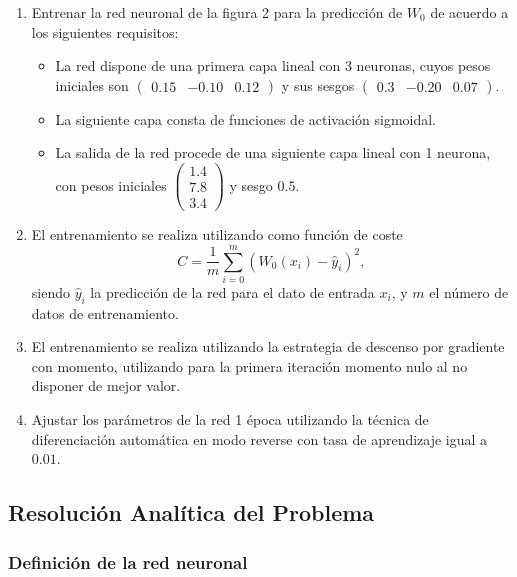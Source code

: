 \documentclass[paper=a4, fontsize=11pt]{scrartcl} %
\numberwithin{equation}{section} %
\numberwithin{figure}{section} %
\numberwithin{table}{section} %
\begin{document}
\begin{enumerate}
    \item Entrenar la red neuronal de la figura 2 para la predicción de \( W_0 \) de acuerdo a los siguientes requisitos:
    \begin{itemize}
        \item La red dispone de una primera capa lineal con 3 neuronas, cuyos pesos iniciales son 
        \(\begin{pmatrix} 0.15 & -0.10 & 0.12 \end{pmatrix}\) y sus sesgos \(\begin{pmatrix} 0.3 & -0.20 & 0.07 \end{pmatrix}\).
        
        \item La siguiente capa consta de funciones de activación sigmoidal.
        
        \item La salida de la red procede de una siguiente capa lineal con 1 neurona, con pesos iniciales 
        \(\begin{pmatrix} 1.4 \\ 7.8 \\ 3.4 \end{pmatrix}\) y sesgo \(0.5\).
    \end{itemize}
    
    \item El entrenamiento se realiza utilizando como función de coste 
    \[
    C = \frac{1}{m} \sum_{i=0}^{m} (W_0(x_i) - \hat{y}_i)^2,
    \]
    siendo \( \hat{y}_i \) la predicción de la red para el dato de entrada \( x_i \), y \( m \) el número de datos de entrenamiento.
    
    \item El entrenamiento se realiza utilizando la estrategia de descenso por gradiente con momento, utilizando para la primera iteración momento nulo al no disponer de mejor valor.
    
    \item Ajustar los parámetros de la red 1 época utilizando la técnica de diferenciación automática en modo reverse con tasa de aprendizaje igual a \( 0.01 \).
\end{enumerate}

\subsection{Resolución Analítica del Problema}

\subsubsection{Definición de la red neuronal}
\end{document}
